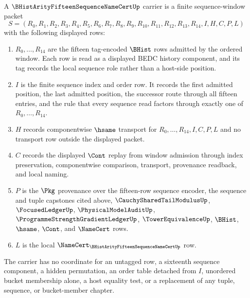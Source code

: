 \begin{definition}
\label{def:b-hist-arity15-sequence-name-cert-window-carrier}
A $\BHistArityFifteenSequenceNameCertUp$ carrier is a finite sequence-window packet
$$
S=(R_0,R_1,R_2,R_3,R_4,R_5,R_6,R_7,R_8,R_9,R_{10},R_{11},R_{12},R_{13},R_{14},I,H,C,P,L)
$$
with the following displayed rows:
\begin{enumerate}
\item $R_0,\ldots,R_{14}$ are the fifteen tag-encoded $\BHist$ rows admitted by the ordered window. Each row is read as a displayed BEDC history component, and its tag records the local sequence role rather than a host-side position.
\item $I$ is the finite sequence index and order row. It records the first admitted position, the last admitted position, the successor route through all fifteen entries, and the rule that every sequence read factors through exactly one of $R_0,\ldots,R_{14}$.
\item $H$ records componentwise $\hsame$ transport for $R_0,\ldots,R_{14},I,C,P,L$ and no transport row outside the displayed packet.
\item $C$ records the displayed $\Cont$ replay from window admission through index preservation, componentwise comparison, transport, provenance readback, and local naming.
\item $P$ is the $\Pkg$ provenance over the fifteen-row sequence encoder, the sequence and tuple capstones cited above, $\CauchySharedTailModulusUp$, $\FocusedLedgerUp$, $\PhysicalModelAuditUp$, $\ProgrammeStrengthGradientLedgerUp$, $\TowerEquivalenceUp$, $\BHist$, $\hsame$, $\Cont$, and $\NameCert$ rows.
\item $L$ is the local $\NameCert_{\BHistArityFifteenSequenceNameCertUp}$ row.
\end{enumerate}
The carrier has no coordinate for an untagged row, a sixteenth sequence component, a hidden permutation, an order table detached from $I$, unordered bucket membership alone, a host equality test, or a replacement of any tuple, sequence, or bucket-member chapter.
\end{definition}

